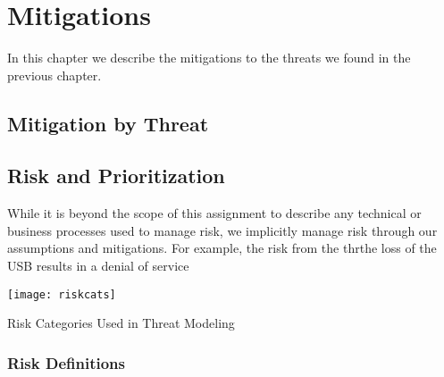 \chapter{Mitigations}
\label{ch:mitigations}
In this chapter we describe the mitigations to the threats we found in
the previous chapter.

\section{Mitigation by Threat}

\section{Risk and Prioritization}
\label{sec:risk}
While it is beyond the scope of this assignment to describe any technical or business processes used to manage risk, we implicitly manage risk through our assumptions and mitigations.  For example, the risk from the thrthe loss of the USB results in a denial of service

\begin{marginfigure}
    \centering
    \texttt{[image: riskcats]}
    \caption{Risk Categories Used in Threat Modeling}
    \label{fig:riskcats}
\end{marginfigure}


\subsection{Risk Definitions}

